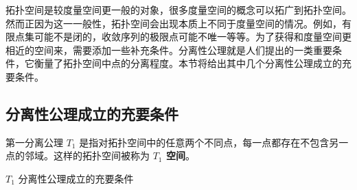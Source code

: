
拓扑空间是较度量空间更一般的对象，很多度量空间的概念可以拓广到拓扑空间。然而正因为这一一般性，拓扑空间会出现本质上不同于度量空间的情况。例如，有限点集可能不是闭的，收敛序列的极限点可能不唯一等等。为了获得和度量空间更相近的空间来，需要添加一些补充条件。分离性公理就是人们提出的一类重要条件，它衡量了拓扑空间中点的分离程度。本节将给出其中几个分离性公理成立的充要条件。

\subsection{分离性公理成立的充要条件}
第一分离公理 $T_1$ 是指对拓扑空间中的任意两个不同点，每一点都存在不包含另一点的邻域。这样的拓扑空间被称为\textbf{ $T_1$ 空间}。
\begin{theorem}{$T_1$ 分离性公理成立的充要条件}

\end{theorem}

















